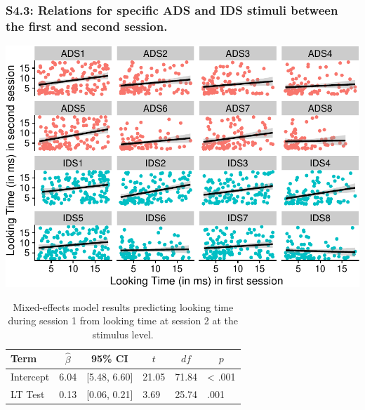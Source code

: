 \documentclass[
  man, donotrepeattitle,floatsintext]{apa6}
\begin{document}
\hypertarget{s4.3-relations-for-specific-ads-and-ids-stimuli-between-the-first-and-second-session.}{%
\subsubsection{S4.3: Relations for specific ADS and IDS stimuli between the first and second session.}\label{s4.3-relations-for-specific-ads-and-ids-stimuli-between-the-first-and-second-session.}}

\includegraphics{MB1T_supplement_files/figure-latex/unnamed-chunk-7-1.pdf}

\begin{table}[tbp]

\begin{center}
\begin{threeparttable}

\caption{\label{tab:unnamed-chunk-7}Mixed-effects model results predicting looking time during session 1 from looking time at session 2 at the stimulus level.}

\begin{tabular}{llllll}
\toprule
Term & \multicolumn{1}{c}{$\hat{\beta}$} & \multicolumn{1}{c}{95\% CI} & \multicolumn{1}{c}{$t$} & \multicolumn{1}{c}{$\mathit{df}$} & \multicolumn{1}{c}{$p$}\\
\midrule
Intercept & 6.04 & {}[5.48, 6.60] & 21.05 & 71.84 & < .001\\
LT Test & 0.13 & {}[0.06, 0.21] & 3.69 & 25.74 & .001\\
\bottomrule
\end{tabular}

\end{threeparttable}
\end{center}

\end{table}
\end{document}

